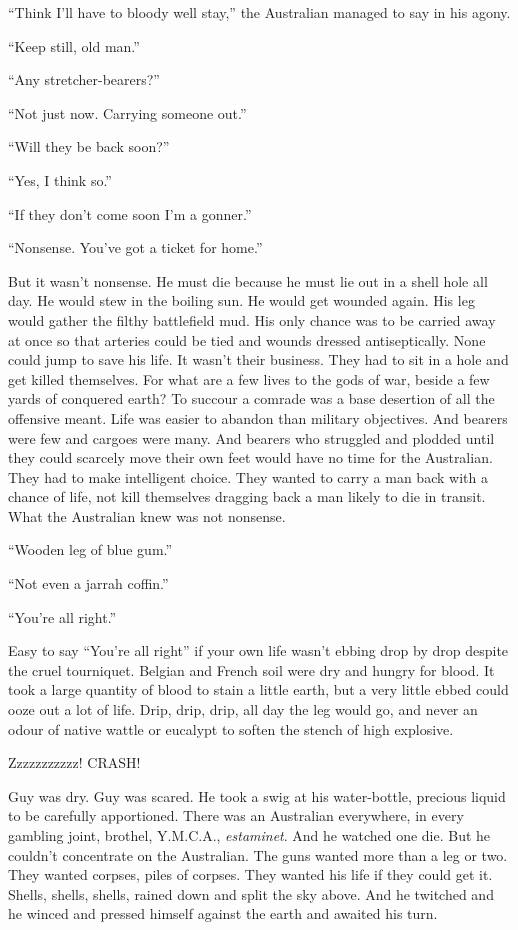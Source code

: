 ``Think I'll have to bloody well stay,'' the Australian managed to say in his agony.

``Keep still, old man.''

``Any stretcher-bearers?''

``Not just now. Carrying someone out.''

``Will they be back soon?''

``Yes, I think so.''

``If they don't come soon I'm a gonner.''

``Nonsense. You've got a ticket for home.''

But it wasn't nonsense. He must die because he must lie out in a shell hole all day. He would stew in the boiling sun. He would get wounded again. His leg would gather the filthy battlefield mud. His only chance was to be carried away at once so that arteries could be tied and wounds dressed antiseptically. None could jump to save his life. It wasn't their business. They had to sit in a hole and get killed themselves. For what are a few lives to the gods of war, beside a few yards of conquered earth? To succour a comrade was a base desertion of all the offensive meant. Life was easier to abandon than military objectives. And bearers were few and cargoes were many. And bearers who struggled and plodded until they could scarcely move their own feet would have no time for the Australian. They had to make intelligent choice. They wanted to carry a man back with a chance of life, not kill themselves dragging back a man likely to die in transit. What the Australian knew was not nonsense.

``Wooden leg of blue gum.''

``Not even a jarrah coffin.''

``You're all right.''

Easy to say ``You're all right'' if your own life wasn't ebbing drop by drop despite the cruel tourniquet. Belgian and French soil were dry and hungry for blood. It took a large quantity of blood to stain a little earth, but a very little ebbed could ooze out a lot of life. Drip, drip, drip, all day the leg would go, and never an odour of native wattle or eucalypt to soften the stench of high explosive.

Zzzzzzzzzzz! CRASH!

Guy was dry. Guy was scared. He took a swig at his water-bottle, precious liquid to be carefully apportioned. There was an Australian everywhere, in every gambling joint, brothel, Y.M.C.A., \emph{estaminet}. And he watched one die. But he couldn't concentrate on the Australian. The guns wanted more than a leg or two. They wanted corpses, piles of corpses. They wanted his life if they could get it. Shells, shells, shells, rained down and split the sky above. And he twitched and he winced and pressed himself against the earth and awaited his turn.

